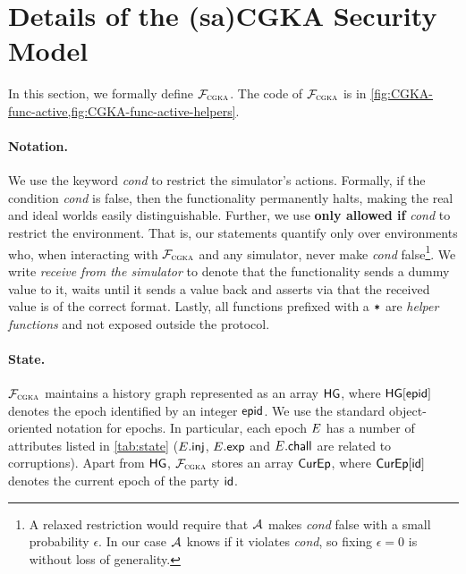 
\section{Details of the (sa)CGKA Security Model}\label{sec:model}
In this section, we formally define $\mathcal{F}_{\normalfont\textsc{cgka}}$. The code of $\mathcal{F}_{\normalfont\textsc{cgka}}$ is in \cref{fig:CGKA-func-active,fig:CGKA-func-active-helpers}.

%
\paragraph{Notation.}
We use the keyword \KwAss{} \textit{cond} to restrict the simulator's actions. Formally, if the condition \textit{cond}
is false, then the functionality permanently halts, making the real and ideal worlds easily distinguishable. Further, we
use {\bf only allowed if} \textit{cond} to restrict the environment. That is, our statements quantify only over
environments who, when interacting with $\mathcal{F}_{\normalfont\textsc{cgka}}$ and any simulator, never make \textit{cond} false\footnote{A relaxed
  restriction would require that $\mathcal{A}_{\relax}$ makes \textit{cond} false with a small probability $\epsilon$. In our case
  $\mathcal{A}_{\relax}$ knows if it violates \textit{cond}, so fixing $\epsilon=0$ is without loss of generality.}.
We write \emph{receive from the simulator} to denote that the functionality sends a dummy value to it, waits
until it sends a value back and asserts via \KwAss{} that the received value is of the correct format. Lastly, all
functions prefixed with a ${\textnormal{\tt*}}$ are \emph{helper functions} and not exposed outside the protocol.

\paragraph{State.}
$\mathcal{F}_{\normalfont\textsc{cgka}}$ maintains a history graph represented as an array $\mathsf{HG}$, where $\mathsf{HG}[{\normalfont\textsf{epid}}]$ denotes the epoch identified by an integer ${\normalfont\textsf{epid}}$. We use the standard object-oriented notation for epochs. In particular, each epoch $E$ has a number of attributes listed in \cref{tab:state} ($E.\textsf{inj}$, $E.\mathsf{exp}$ and $E.\mathsf{chall}$ are related to corruptions).
 Apart from $\mathsf{HG}$, $\mathcal{F}_{\normalfont\textsc{cgka}}$ stores an array $\textsf{CurEp}$, where $\textsf{CurEp}[{\mathsf{id}}]$ denotes the current epoch of the party ${\mathsf{id}}$.

